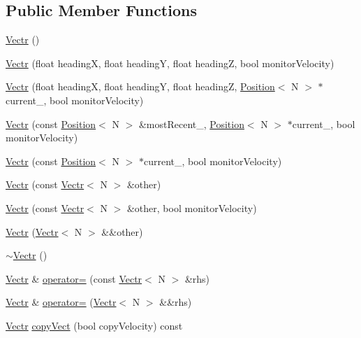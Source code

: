 \subsection*{Public Member Functions}
\begin{DoxyCompactItemize}
\item 
\hyperlink{struct_vectr_a420d21073da712360069e09ae8053375}{Vectr} ()
\item 
\hyperlink{struct_vectr_ad66fbd7bd3c07f5dbbc3219fe55b38a1}{Vectr} (float heading\-X, float heading\-Y, float heading\-Z, bool monitor\-Velocity)
\item 
\hyperlink{struct_vectr_a9be0609df512b225181c555f1c9adecb}{Vectr} (float heading\-X, float heading\-Y, float heading\-Z, \hyperlink{struct_position}{Position}$<$ N $>$ $\ast$current\-\_\-, bool monitor\-Velocity)
\item 
\hyperlink{struct_vectr_a70f3b6c158dc21d03cb449093126b939}{Vectr} (const \hyperlink{struct_position}{Position}$<$ N $>$ \&most\-Recent\-\_\-, \hyperlink{struct_position}{Position}$<$ N $>$ $\ast$current\-\_\-, bool monitor\-Velocity)
\item 
\hyperlink{struct_vectr_a80e5b2b4bafb5689b82bdf5d87cc4b49}{Vectr} (const \hyperlink{struct_position}{Position}$<$ N $>$ $\ast$current\-\_\-, bool monitor\-Velocity)
\item 
\hyperlink{struct_vectr_a8328879b18c117c7b262ce53f5f1acb2}{Vectr} (const \hyperlink{struct_vectr}{Vectr}$<$ N $>$ \&other)
\item 
\hyperlink{struct_vectr_abf42e2cb15d0406f24c5901dbf0a07e1}{Vectr} (const \hyperlink{struct_vectr}{Vectr}$<$ N $>$ \&other, bool monitor\-Velocity)
\item 
\hyperlink{struct_vectr_a394981732ad6d227e5fe1f25f783ce99}{Vectr} (\hyperlink{struct_vectr}{Vectr}$<$ N $>$ \&\&other)
\item 
\hyperlink{struct_vectr_affbf285f9295dd163cc8b0364b871ade}{$\sim$\-Vectr} ()
\item 
\hyperlink{struct_vectr}{Vectr} \& \hyperlink{struct_vectr_ac2e10f418e5b70d4a48bdfad9bf882c4}{operator=} (const \hyperlink{struct_vectr}{Vectr}$<$ N $>$ \&rhs)
\item 
\hyperlink{struct_vectr}{Vectr} \& \hyperlink{struct_vectr_a94436033bb9fb7e6e970028e91dac958}{operator=} (\hyperlink{struct_vectr}{Vectr}$<$ N $>$ \&\&rhs)
\item 
\hyperlink{struct_vectr}{Vectr} \hyperlink{struct_vectr_a90b87763e1858fdaf27cbcd3b8758d0c}{copy\-Vect} (bool copy\-Velocity) const 
\item 

\end{DoxyCompactItemize}
